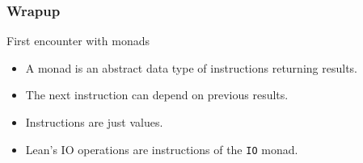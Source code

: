 \documentclass{beamer}
\begin{document}
\begin{frame}
  \frametitle{Wrapup}
  \begin{alertblock}{First encounter with monads}
  \begin{itemize}
  \item A monad is an abstract data type of instructions returning results.
  \item The next instruction can depend on previous results.
  \item Instructions are just values.
  \item Lean's IO operations are instructions of the \texttt{IO} monad.
  \end{itemize}
  \end{alertblock}
\end{frame}

\end{document}

